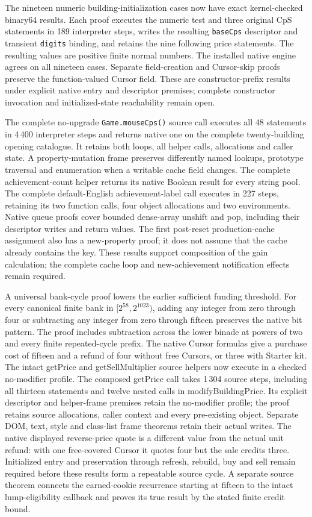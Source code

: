 \documentclass[11pt,a4paper]{article}
\numberwithin{equation}{section}
\theoremstyle{definition}
\theoremstyle{remark}
\begin{document}
The nineteen numeric building-initialization cases now have exact kernel-checked binary64 results. Each proof executes the numeric test and three original CpS statements in 189 interpreter steps, writes the resulting \texttt{baseCps} descriptor and transient \texttt{digits} binding, and retains the nine following price statements. The resulting values are positive finite normal numbers. The installed native engine agrees on all nineteen cases. Separate field-creation and Cursor-skip proofs preserve the function-valued Cursor field. These are constructor-prefix results under explicit native entry and descriptor premises; complete constructor invocation and initialized-state reachability remain open.

The complete no-upgrade \texttt{Game.mouseCps()} source call executes all 48 statements in 4\,400 interpreter steps and returns native one on the complete twenty-building opening catalogue. It retains both loops, all helper calls, allocations and caller state. A property-mutation frame preserves differently named lookups, prototype traversal and enumeration when a writable cache field changes. The complete achievement-count helper returns its native Boolean result for every string pool. The complete default-English achievement-label call executes in 227 steps, retaining its two function calls, four object allocations and two environments. Native queue proofs cover bounded dense-array unshift and pop, including their descriptor writes and return values. The first post-reset production-cache assignment also has a new-property proof; it does not assume that the cache already contains the key. These results support composition of the gain calculation; the complete cache loop and new-achievement notification effects remain required.

A universal bank-cycle proof lowers the earlier sufficient funding threshold. For every canonical finite bank in $[2^{58},2^{1023})$, adding any integer from zero through four or subtracting any integer from zero through fifteen preserves the native bit pattern. The proof includes subtraction across the lower binade at powers of two and every finite repeated-cycle prefix. The native Cursor formulas give a purchase cost of fifteen and a refund of four without free Cursors, or three with Starter kit. The intact getPrice and getSellMultiplier source helpers now execute in a checked no-modifier profile. The composed getPrice call takes 1\,304 source steps, including all thirteen statements and twelve nested calls in modifyBuildingPrice. Its explicit descriptor and helper-frame premises retain the no-modifier profile; the proof retains source allocations, caller context and every pre-existing object. Separate DOM, text, style and class-list frame theorems retain their actual writes. The native displayed reverse-price quote is a different value from the actual unit refund: with one free-covered Cursor it quotes four but the sale credits three. Initialized entry and preservation through refresh, rebuild, buy and sell remain required before these results form a repeatable source cycle. A separate source theorem connects the earned-cookie recurrence starting at fifteen to the intact lump-eligibility callback and proves its true result by the stated finite credit bound.
\end{document}
